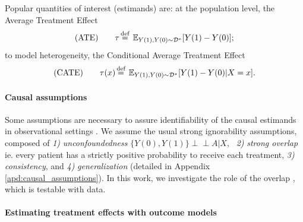 \documentclass[10pt]{article}
\newcommand{\indep}{\perp \!\!\! \perp}
\newcommand\myeq{\stackrel{\mathclap{\text{def}}}{=}}
\begin{document}
\begin{multicols}{2}
    Popular quantities of interest (estimands) are:
    at the population level, the
    Average Treatment Effect
    \begin{equation*}
        \text{(ATE)}\qquad
        \tau \myeq \; \mathbb{E}_{Y(1),Y(0) \sim \mathcal D^*}[Y(1) - Y(0)];
    \end{equation*}
    to model heterogeneity, the Conditional Average Treatment Effect
    \begin{equation*}
        \text{(CATE)}\qquad
        \tau (x) \myeq \; \mathbb{E}_{Y(1),Y(0) \sim \mathcal{D}^\star}[Y(1) - Y(0) | X=x].
    \end{equation*}

    \paragraph{Causal assumptions}

    Some assumptions are necessary to assure identifiability of the causal estimands
    in observational settings \cite{rubin_causal_2005}. We assume the usual
    strong ignorability assumptions, composed of \emph{1)}
    \emph{unconfoundedness} $\{Y(0),
        Y(1) \} \indep A | X$, \emph{~2)} \emph{strong overlap} ie. every patient has a
    strictly positive probability to receive each treatment, \emph{3)}
    \emph{consistency}, and \emph{4)} \emph{generalization} (detailed in Appendix
    \ref{apd:causal_assumptions}). In this work, we investigate the
    role of the overlap \cite{damour_overlap_2020}, which is testable with
    data.

    \paragraph{Estimating treatment effects with outcome models}\label{subsec:estimators}


\end{multicols}
\end{document}
